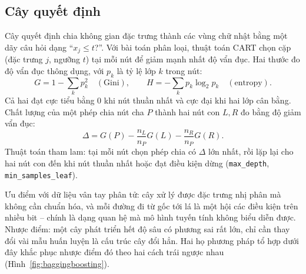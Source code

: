 \documentclass[12pt,a4paper,oneside]{report}
\begin{document}
\subsection{Cây quyết định}
Cây quyết định chia không gian đặc trưng thành các vùng chữ nhật bằng một dãy
câu hỏi dạng ``$x_j \le t$?''. Với bài toán phân loại, thuật toán CART chọn
cặp (đặc trưng $j$, ngưỡng $t$) tại mỗi nút để giảm mạnh nhất độ vẩn đục.
Hai thước đo độ vẩn đục thông dụng, với $p_k$ là tỷ lệ lớp $k$ trong nút:
\begin{equation}
  G = 1 - \sum_{k} p_k^{2} \quad (\text{Gini}),
  \qquad
  H = -\sum_{k} p_k \log_2 p_k \quad (\text{entropy}).
  \label{eq:gini}
\end{equation}
Cả hai đạt cực tiểu bằng 0 khi nút thuần nhất và cực đại khi hai lớp cân bằng.
Chất lượng của một phép chia nút cha $P$ thành hai nút con $L, R$ đo bằng
độ giảm vẩn đục:
\begin{equation}
  \Delta = G(P) - \frac{n_L}{n_P} G(L) - \frac{n_R}{n_P} G(R).
  \label{eq:deltagini}
\end{equation}
Thuật toán tham lam: tại mỗi nút chọn phép chia có $\Delta$ lớn nhất, rồi lặp
lại cho hai nút con đến khi nút thuần nhất hoặc đạt điều kiện dừng
(\texttt{max\_depth}, \texttt{min\_samples\_leaf}).

Ưu điểm với dữ liệu vân tay phân tử: cây xử lý được đặc trưng nhị phân mà không cần
chuẩn hóa, và mỗi đường đi từ gốc tới lá là một hội các điều kiện trên
nhiều bit -- chính là dạng quan hệ mà mô hình tuyến tính không biểu diễn được.
Nhược điểm: một cây phát triển hết độ sâu có phương sai rất lớn, chỉ cần thay
đổi vài mẫu huấn luyện là cấu trúc cây đổi hẳn. Hai họ phương pháp tổ hợp dưới
đây khắc phục nhược điểm đó theo hai cách trái ngược nhau
(Hình~\ref{fig:baggingboosting}).
\end{document}
